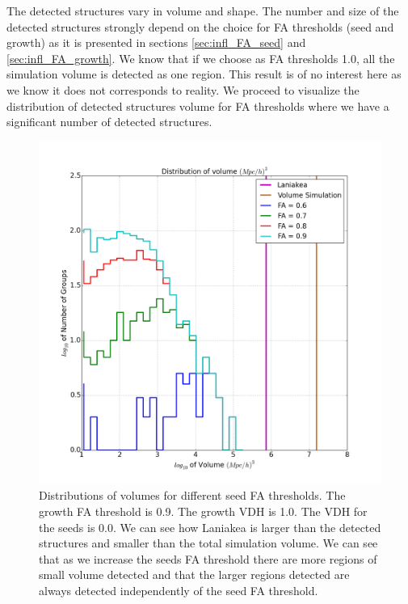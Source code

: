\documentclass[12pt]{article}
\begin{document}
\begin{par}
The detected structures vary in volume and shape.
 The number and size of the detected structures
  strongly depend on the choice for FA thresholds
   (seed and growth) as it is presented in sections
    \ref{sec:infl_FA_seed} and
     \ref{sec:infl_FA_growth}. 
We know that if we choose as
 FA thresholds 1.0, all the simulation volume is
  detected as one region. This result is of no interest
   here as we know it does not corresponds to reality. 
     We proceed to visualize the distribution of
      detected structures volume for FA thresholds
       where we have a significant number of
        detected structures.\\
\end{par}

\begin{figure}[ht]
\centering
  \includegraphics[width=1.1\textwidth]{groups/volumes_distr_Mpc_laniakea_all_plot.png}
\caption{Distributions of volumes for different seed FA thresholds. The growth FA threshold is 0.9. The growth VDH is 1.0. The VDH for the seeds is 0.0. We can see how Laniakea is larger than the detected structures and smaller than the total simulation volume. We can see that as we increase the seeds FA threshold there are more regions of small volume detected and that the larger regions detected are always detected independently of the seed FA threshold.} \label{fg:compare_lan_larg}
\end{figure}
\FloatBarrier
\end{document}
